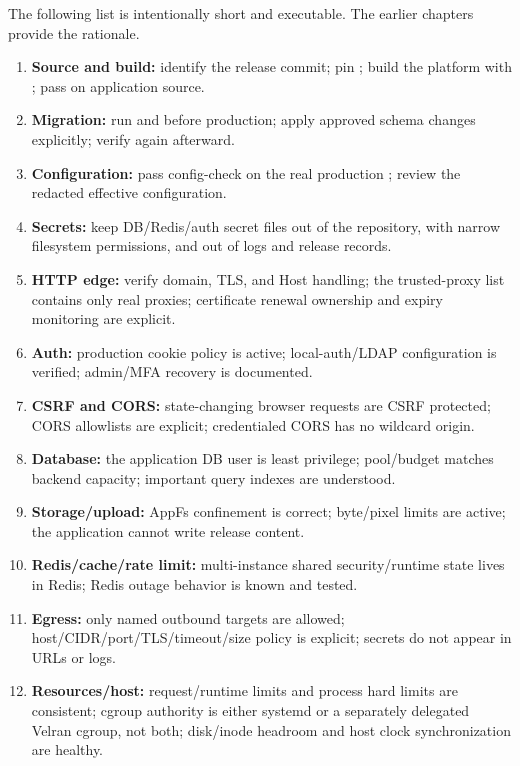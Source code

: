 The following list is intentionally short and executable. The earlier chapters provide the rationale.

\begin{enumerate}
  \item \textbf{Source and build:} identify the release commit; pin ; build the platform with ; pass  on application source.
  \item \textbf{Migration:} run  and  before production; apply approved schema changes explicitly; verify again afterward.
  \item \textbf{Configuration:} pass config-check on the real production ; review the redacted effective configuration.
  \item \textbf{Secrets:} keep DB/Redis/auth secret files out of the repository, with narrow filesystem permissions, and out of logs and release records.
  \item \textbf{HTTP edge:} verify domain, TLS, and Host handling; the trusted-proxy list contains only real proxies; certificate renewal ownership and expiry monitoring are explicit.
  \item \textbf{Auth:} production cookie policy is active; local-auth/LDAP configuration is verified; admin/MFA recovery is documented.
  \item \textbf{CSRF and CORS:} state-changing browser requests are CSRF protected; CORS allowlists are explicit; credentialed CORS has no wildcard origin.
  \item \textbf{Database:} the application DB user is least privilege; pool/budget matches backend capacity; important query indexes are understood.
  \item \textbf{Storage/upload:} AppFs confinement is correct; byte/pixel limits are active; the application cannot write release content.
  \item \textbf{Redis/cache/rate limit:} multi-instance shared security/runtime state lives in Redis; Redis outage behavior is known and tested.
  \item \textbf{Egress:} only named outbound targets are allowed; host/CIDR/port/TLS/timeout/size policy is explicit; secrets do not appear in URLs or logs.
  \item \textbf{Resources/host:} request/runtime limits and process hard limits are consistent; cgroup authority is either systemd or a separately delegated Velran cgroup, not both; disk/inode headroom and host clock synchronization are healthy.

\end{enumerate}
